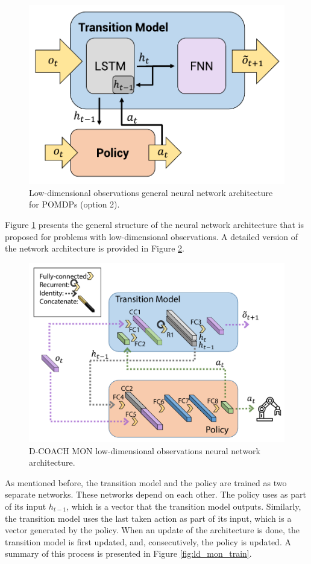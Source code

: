 \newpage

\begin{figure}[H]
    \centering
    \includegraphics[width=0.6\linewidth]{imagenes/cap4/ld_model.pdf}
    \caption{Low-dimensional observations general neural network architecture for POMDPs (option 2).}
    \label{fig:ld_model_win}
\end{figure}

Figure \ref{fig:ld_model_win} presents the general structure of the neural network architecture that is proposed for problems with low-dimensional observations. A detailed version of the network architecture is provided in Figure \ref{fig:detailed_ld}.

\begin{figure}[h]
    \centering
    \includegraphics[width=0.8\linewidth]{imagenes/cap4/ld_model_det.pdf}
    \caption{D-COACH MON low-dimensional observations neural network architecture.}
    \label{fig:detailed_ld}
\end{figure}

As mentioned before, the transition model and the policy are trained as two separate networks. These networks depend on each other. The policy uses as part of its input $h_{t-1}$, which is a vector that the transition model outputs. Similarly, the transition model uses the last taken action as part of its input, which is a vector generated by the policy. When an update of the architecture is done, the transition model is first updated, and, consecutively, the policy is updated. A summary of this process is presented in Figure \ref{fig:ld_mon_train}.

